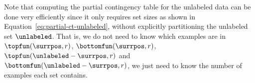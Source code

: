 
Note that computing the partial contingency table for the unlabeled data can be done very efficiently since it only requires set sizes as shown in Equation~\ref{eq:partial-ct-unlabeled}, without explicitly partitioning the unlabeled set $\unlabeled$. That is, we do not need to know which examples are in $\topfun(\surrpos,r)$, $\bottomfun(\surrpos,r)$, $\topfun(\unlabeled-\surrpos,r)$ and $\bottomfun(\unlabeled-\surrpos,r)$, we just need to know the number of examples each set contains.









